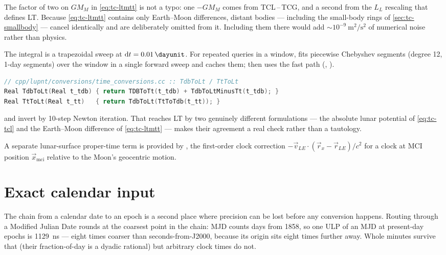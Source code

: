 \begin{lupntnote}
The factor of two on $GM_M$ in \cref{eq:tc-ltmtt} is not a typo: one $-GM_M$
comes from TCL\,--\,TCG, and a second from the $L_L$ rescaling that defines LT.
Because \cref{eq:tc-ltmtt} contains only Earth--Moon differences, distant
bodies --- including the small-body rings of \cref{sec:tc-smallbody} ---
cancel identically and are deliberately omitted from it. Including them there
would add ${\sim}10^{-9}\ \si{\meter\squared\per\second\squared}$ of numerical
noise rather than physics.
\end{lupntnote}

The integral is a trapezoidal sweep at $\dd t = \SI{0.01}{\dayunit}$. For
repeated queries in a window,  fits piecewise Chebyshev
segments (degree 12, 1-day segments) over the window in a single forward sweep
and caches them;  then uses the fast path
(, ).

\begin{lstlisting}[language=cpp]
// cpp/lupnt/conversions/time_conversions.cc :: TdbToLt / TtToLt
Real TdbToLt(Real t_tdb) { return TDBToTt(t_tdb) + TdbToLtMinusTt(t_tdb); }
Real TtToLt(Real t_tt)   { return TdbToLt(TtToTdb(t_tt)); }
\end{lstlisting}

 and  invert by 10-step Newton iteration. That
\lupnt{} reaches LT by two genuinely different formulations --- the absolute
lunar potential of \cref{eq:tc-tcl} and the Earth--Moon difference of
\cref{eq:tc-ltmtt} --- makes their agreement a real check rather than a
tautology.

A separate lunar-surface proper-time term is provided by
, the first-order clock
correction $-\vec{v}_{LE}\cdot(\vec{r}_x - \vec{r}_{LE})/c^2$ for a clock at
MCI position $\vec{x}_{\mathrm{mci}}$ relative to the Moon's geocentric motion.

\section{Exact calendar input}
\label{sec:tc-calendar}

The chain from a calendar date to an epoch is a second place where precision
can be lost before any conversion happens. Routing through a Modified Julian
Date rounds at the coarsest point in the chain: MJD counts days from 1858, so
one ULP of an MJD at present-day epochs is \SI{1129}{\nano\second} --- eight
times coarser than seconds-from-J2000, because its origin sits eight times
further away. Whole minutes survive that (their fraction-of-day is a dyadic
rational) but arbitrary clock times do not.

